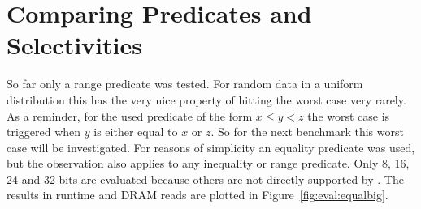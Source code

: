 \section{Comparing Predicates and Selectivities}

So far only a range predicate was tested. For random data in a uniform
distribution this has the very nice property of hitting the worst case very
rarely. As a reminder, for the used predicate of the form $x\le y < z$ the worst
case is triggered when $y$ is either equal to $x$ or $z$. So for the next
benchmark this worst case will be investigated. For reasons of simplicity an
equality predicate was used, but the observation also applies to any inequality
or range predicate. Only 8, 16, 24 and 32 bits are evaluated because others are
not directly supported by \bs{}. The results in runtime and DRAM reads are
plotted in Figure~\ref{fig:eval:equalbig}.


